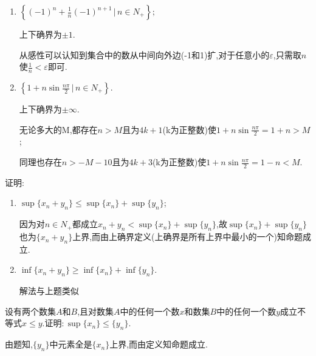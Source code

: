 \begin{exercise}
\begin{enumerate}
\begin{solution}
                   \end{solution}
             \item $\left\{(-1)^n+\frac{1}{n}(-1)^{n+1}\,\biggl\lvert\, n\in N_+\right\};$
                   \begin{solution}
                       上下确界为$\pm 1$.

                       从感性可以认知到集合中的数从中间向外边(-1和1)扩,对于任意小的$\varepsilon$,只需取$n$使$\frac{1}{n}<\varepsilon$即可.
                   \end{solution}
             \item $\left\{1+n\sin\frac{n\pi}{2}\,\bigg\lvert\, n\in N_+\right\}$.
                   \begin{solution}
                       上下确界为$\pm \infty$.

                       无论多大的M,都存在$n>M$且为$4k+1$(k为正整数)使$1+n\sin\frac{n\pi}{2}=1+n>M$;

                       同理也存在$n>-M-10$且为$4k+3$(k为正整数)使$1+n\sin\frac{n\pi}{2}=1-n<M$.
                   \end{solution}
         \end{enumerate}
     \end{exercise}

     \begin{exercise}
         证明:
         \begin{enumerate}
             \item $\sup\{x_n+y_n\}\leqslant \sup\{x_n\}+\sup\{y_n\}$;
                   \begin{solution}
                       因为对$n\in N_+$都成立$x_n+y_n<\sup\{x_n\}+\sup\{y_n\}$,故$\sup\{x_n\}+\sup\{y_n\}$也为$\{x_n+y_n\}$上界,而由上确界定义(上确界是所有上界中最小的一个)知命题成立.
                   \end{solution}
             \item $\inf\{x_n+y_n\}\geqslant\inf\{x_n\}+\inf\{y_n\}$.
                   \begin{solution}
                       解法与上题类似
                   \end{solution}
         \end{enumerate}
     \end{exercise}

     \begin{exercise}
         设有两个数集$A$和$B$,且对数集$A$中的任何一个数$x$和数集$B$中的任何一个数$y$成立不等式$x\leqslant y$.证明:\,$\sup\{x_n\}\leqslant\{y_n\}$.
     \end{exercise}
     \begin{solution}
         由题知,$\{y_n\}$中元素全是$\{x_n\}$上界,而由定义知命题成立.
     \end{solution}

